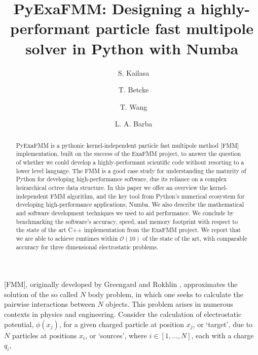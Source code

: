 \documentclass{IEEEcsmag}
\begin{document}

\title{PyExaFMM: Designing a highly-performant particle fast multipole solver in Python with Numba}

\author{\ S. Kailasa}

\author{\ T. Betcke}

\author{\ T. Wang}

\author{\ L. A. Barba}


\begin{abstract}
PyExaFMM is a pythonic kernel-independent particle fast multipole method [FMM] implementation, built on the success of the ExaFMM project, to answer the question of whether we could develop a highly-performant scientific code without resorting to a lower level language. The FMM is a good case study for understanding the maturity of Python for developing high-performance software, due its reliance on a complex heirarchical octree data structure. In this paper we offer an overview the kernel-independent FMM algorithm, and the key tool from Python's numerical ecosystem for developing high-performance applications, Numba. We also describe the mathematical and software development techniques we used to aid performance. We conclude by benchmarking the software's accuracy, speed, and memory footprint with respect to the state of the art C++ implementation from the ExaFMM project. We report that we are able to achieve runtimes within $\mathcal{O}(10)$ of the state of the art, with comparable accuracy for three dimensional electrostatic problems.

\end{abstract}

\maketitle

 [FMM], originally developed by Greengard and Rokhlin \cite{Greengard1987}, approximates the solution of the so called $N$ body problem, in which one seeks to calculate the pairwise interactions between $N$ objects. This problem arises in numerous contexts in physics and engineering. Consider the calculation of electrostatic potential, $\phi(x_j)$, for a given charged particle at position $x_j$, or `target', due to $N$ particles at positions $x_i$, or `sources', where $i \in [1, ..., N]$, each with a charge $q_i$,
\end{document}
